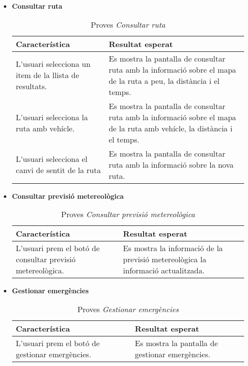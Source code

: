 \begin{itemize}
\item{}\textbf{Consultar ruta}

\begin{table}[!h]
\centering
\begin{tabular}{|T|T|}
\hline
\textbf{Característica}  & \textbf{Resultat esperat} \\\hline
L'usuari selecciona un item de la llista de resultats. & Es mostra la pantalla de consultar ruta amb la informació sobre el mapa de la ruta a peu, la distància i el temps.\\\hline
L'usuari selecciona la ruta amb vehícle. & Es mostra la pantalla de consultar ruta amb la informació sobre el mapa de la ruta amb vehícle, la distància i el temps.\\\hline
L'usuari selecciona el canvi de sentit de la ruta & Es mostra la pantalla de consultar ruta amb la informació sobre la nova ruta.\\\hline
\end{tabular}
\label{}
\caption{Proves \textit{Consultar ruta}}
\end{table}

\item{}\textbf{Consultar previsió metereològica}

\begin{table}[!h]
\centering
\begin{tabular}{|T|T|}
\hline
\textbf{Característica}  & \textbf{Resultat esperat} \\\hline
L'usuari prem el botó de consultar previsió metereològica. & Es mostra la informació de la previsió metereològica la informació actualitzada.\\\hline
\end{tabular}
\label{}
\caption{Proves \textit{Consultar previsió metereològica}}
\end{table}

\item{}\textbf{Gestionar emergències}

\begin{table}[!h]
\centering
\begin{tabular}{|T|T|}
\hline
\textbf{Característica}  & \textbf{Resultat esperat} \\\hline
L'usuari prem el botó de gestionar emergències. & Es mostra la pantalla de gestionar emergències.\\\hline
\end{tabular}
\label{}
\caption{Proves \textit{Gestionar emergències}}
\end{table}


\end{itemize}
